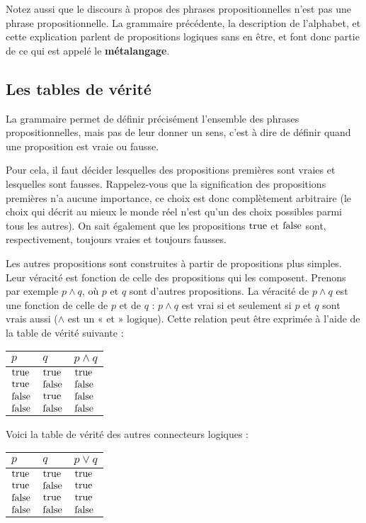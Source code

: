 Notez aussi que le discours à propos des phrases propositionnelles n’est
pas une phrase propositionnelle. La grammaire précédente, la description de
l’alphabet, et cette explication parlent de propositions logiques sans en
être, et font donc partie de ce qui est appelé le \textbf{métalangage}.

\subsection{Les tables de vérité}

La grammaire permet de définir précisément l’ensemble des phrases
propositionnelles, mais pas de leur donner un sens, c’est à dire de définir
quand une proposition est vraie ou fausse.

Pour cela, il faut décider lesquelles des propositions premières sont vraies
et lesquelles sont fausses. Rappelez-vous que la signification des
propositions premières n’a aucune importance, ce choix est donc complètement
arbitraire (le choix qui décrit au mieux le monde réel n’est qu’un des choix
possibles parmi tous les autres). On sait également que les propositions
$\mathrm{true}$ et $\mathrm{false}$ sont, respectivement, toujours vraies et toujours
fausses.

Les autres propositions sont construites à partir de propositions plus
simples. Leur véracité est fonction de celle des propositions qui les
composent. Prenons par exemple $p \land q$, où $p$ et $q$ sont d’autres
propositions. La véracité de $p \land q$ est une fonction de celle de $p$ et
de $q$ : $p \land q$ est vrai si et seulement si $p$ et $q$ sont vrais aussi
($\land$ est un « et » logique). Cette relation peut être exprimée à l’aide
de la table de vérité suivante :

\vspace{2 mm}
\begin{tabular}{ll|l}
  $p$ & $q$ & $p \land q$ \\
  \hline

  $\mathrm{true}$ & $\mathrm{true}$ & $\mathrm{true}$ \\
  $\mathrm{true}$ & $\mathrm{false}$ & $\mathrm{false}$ \\
  $\mathrm{false}$ & $\mathrm{true}$ & $\mathrm{false}$ \\
  $\mathrm{false}$ & $\mathrm{false}$ & $\mathrm{false}$
\end{tabular}

\vspace{2 mm}
Voici la table de vérité des autres connecteurs logiques :
\vspace{2 mm}

\begin{tabular}{ll|l}
  $p$ & $q$ & $p \lor q$ \\
  \hline

  $\mathrm{true}$ & $\mathrm{true}$ & $\mathrm{true}$ \\
  $\mathrm{true}$ & $\mathrm{false}$ & $\mathrm{true}$ \\
  $\mathrm{false}$ & $\mathrm{true}$ & $\mathrm{true}$ \\
  $\mathrm{false}$ & $\mathrm{false}$ & $\mathrm{false}$
\end{tabular}
\vspace{2 mm}

